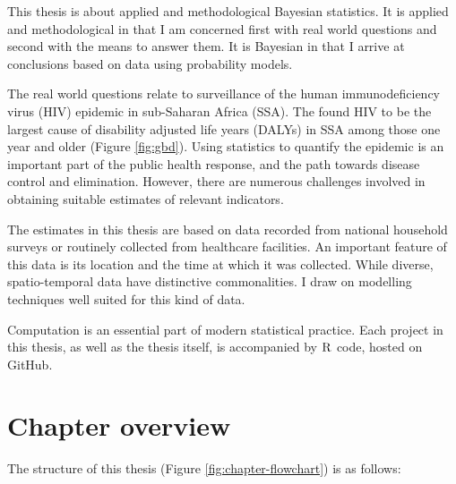 \documentclass[a4paper, nobind]{templates/ociamthesis}
\begin{document}
This thesis is about applied and methodological Bayesian statistics.
It is applied and methodological in that I am concerned first with real world questions and second with the means to answer them.
It is Bayesian in that I arrive at conclusions based on data using probability models.

The real world questions relate to surveillance of the human immunodeficiency virus (HIV) epidemic in sub-Saharan Africa (SSA).
The \textcite{ihme1} found HIV to be the largest cause of disability adjusted life years (DALYs) in SSA among those one year and older (Figure \ref{fig:gbd}).
Using statistics to quantify the epidemic is an important part of the public health response, and the path towards disease control and elimination.
However, there are numerous challenges involved in obtaining suitable estimates of relevant indicators.

The estimates in this thesis are based on data recorded from national household surveys or routinely collected from healthcare facilities.
An important feature of this data is its location and the time at which it was collected.
While diverse, spatio-temporal data have distinctive commonalities.
I draw on modelling techniques well suited for this kind of data.

Computation is an essential part of modern statistical practice.
Each project in this thesis, as well as the thesis itself, is accompanied by \(\textsc{R}\) code, hosted on GitHub.

\hypertarget{chapter-overview}{%
\section{Chapter overview}\label{chapter-overview}}

The structure of this thesis (Figure \ref{fig:chapter-flowchart}) is as follows:
\end{document}
